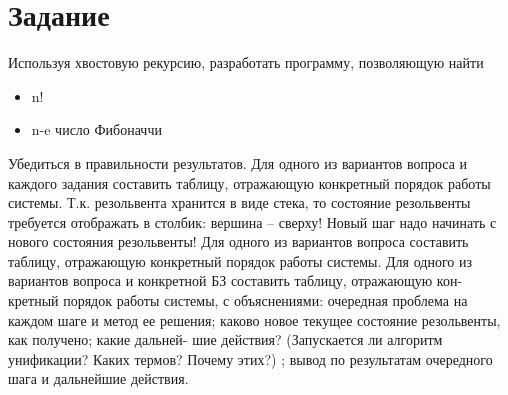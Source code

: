 \section{Задание}

Используя хвостовую рекурсию, разработать программу, позволяющую найти
\begin{itemize}
    \item n!
    \item n-e число Фибоначчи 
\end{itemize}

Убедиться в правильности результатов.
Для одного из вариантов вопроса и каждого задания составить таблицу, отражающую
конкретный порядок работы системы.
Т.к. резольвента хранится в виде стека, то состояние резольвенты требуется отображать
в столбик: вершина – сверху! Новый шаг надо начинать с нового состояния резольвенты!
Для одного из вариантов вопроса составить таблицу, отражающую конкретный порядок
работы системы.
Для одного из вариантов вопроса и конкретной БЗ составить таблицу, отражающую кон-
кретный порядок работы системы, с объяснениями: очередная проблема на каждом шаге и
метод ее решения; каково новое текущее состояние резольвенты, как получено; какие дальней-
шие действия? (Запускается ли алгоритм унификации? Каких термов? Почему этих?) ; вывод
по результатам очередного шага и дальнейшие действия.